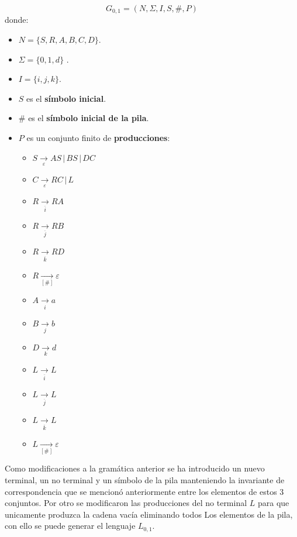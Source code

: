\documentclass{article}
\begin{document}
$$
    G_{0,1} = (N, \Sigma, I, S, \#, P) 
$$
donde:

\begin{itemize}
    \item $N= \{S,R,A,B,C,D\}$.
    \item \( \Sigma=\{0,1,d\} \) .
    \item $I=\{i,j,k\}$.
    \item $S$ es el \textbf{símbolo inicial}.
    \item $\#$ es el \textbf{símbolo inicial de la pila}.
    \item $P$ es un conjunto finito de \textbf{producciones}:
          \begin{multicols}{2}
              \begin{itemize}
                  \item $S\underset{\varepsilon}{\to} AS\,|\,BS\,|\,DC$
                  \item $C\underset{\varepsilon}{\to} RC\,|\,L$
                  \item $R\underset{\overline{i}}{\to} RA$
                  \item $R\underset{\overline{j}}{\to} RB$
                  \item $R\underset{\overline{k}}{\to} RD$
                        
                  \item $R\underset{[\#]}{\to} \varepsilon$
                  \item $A\underset{i}{\to} a$
                  \item $B\underset{j}{\to} b$
                  \item $D\underset{k}{\to} d$
                  \item $L\underset{\overline{i}}{\to} L$
                  \item $L\underset{\overline{j}}{\to} L$
                  \item $L\underset{\overline{k}}{\to} L$
                  \item $L\underset{[\#]}{\to} \varepsilon$
              \end{itemize}
          \end{multicols}
\end{itemize}

Como modificaciones a la gramática anterior se ha introducido un nuevo terminal, un no terminal y un símbolo de la pila 
manteniendo la invariante de correspondencia que se mencionó anteriormente entre los elementos de estos 3 conjuntos. Por
otro se modificaron las producciones del no terminal $L$ para que unicamente produzca la cadena vacía eliminando todos Los
elementos de la pila, con ello se puede generar el lenguaje $L_{0,1}$.
\end{document}
